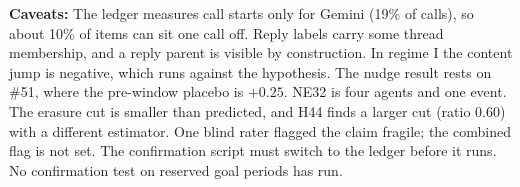 \textbf{Caveats:}
The ledger measures call starts only for Gemini (19\% of calls), so about 10\% of items can sit one call off.
Reply labels carry some thread membership, and a reply parent is visible by construction.
In regime I the content jump is negative, which runs against the hypothesis.
The nudge result rests on \#51, where the pre-window placebo is $+0.25$.
NE32 is four agents and one event.
The erasure cut is smaller than predicted, and H44 finds a larger cut (ratio 0.60) with a different estimator.
One blind rater flagged the claim fragile; the combined flag is not set.
The confirmation script must switch to the ledger before it runs.
No confirmation test on reserved goal periods has run.
